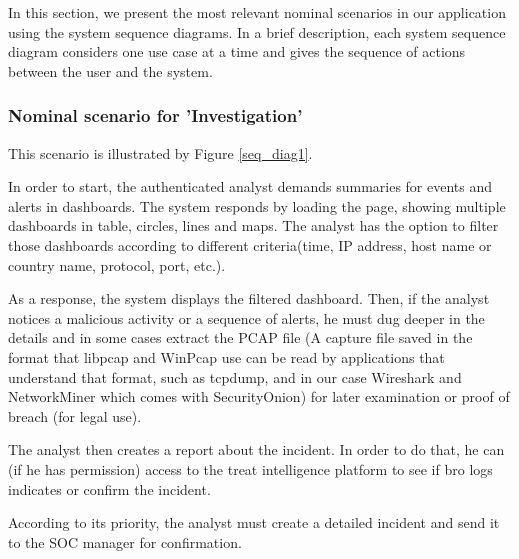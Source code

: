 In this section, we present the most relevant nominal scenarios in our application using the system sequence diagrams. In a brief description, each system sequence diagram considers one use case at a time and gives the sequence of actions between the user and the system.

\subsubsection *{Nominal scenario for 'Investigation' }

This scenario is illustrated by Figure \ref{seq_diag1}.

In order to start, the authenticated analyst demands summaries for events and alerts in dashboards. The system responds by loading the page, showing multiple dashboards in table, circles, lines and maps. The analyst has the option to filter those dashboards according to different criteria(time, IP address, host name or country name, protocol, port, etc.). 

As a response, the system displays the filtered dashboard. Then, if the analyst notices a malicious activity or a sequence of alerts, he must dug deeper in the details and in some cases extract the PCAP file (A capture file saved in the format that libpcap and WinPcap use can be read by applications that understand that format, such as tcpdump, and in our case Wireshark and NetworkMiner which comes with SecurityOnion) for later examination or proof of breach (for legal use). 

The analyst then creates a report about the incident. In order to do that, he can (if he has permission) access to the treat intelligence platform to see if bro logs indicates or confirm the incident. 

According to its priority, the analyst must create a detailed incident and send it to the SOC manager for confirmation.


